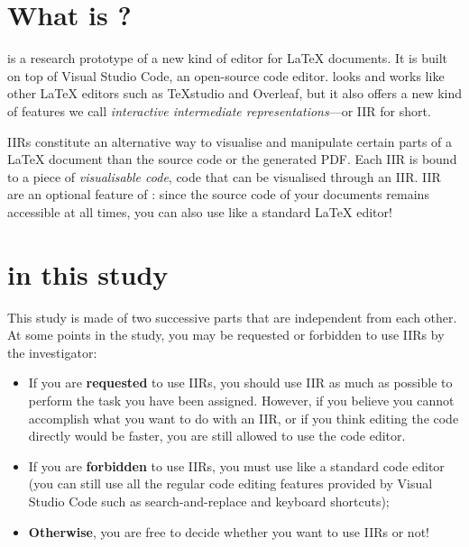 \documentclass[11pt, a4paper]{article}
\begin{document}
\vfill
\tableofcontents



\section{What is \iLaTeX{}?}
\iLaTeX{} is a research prototype of a new kind of editor for \LaTeX{} documents.
It is built on top of Visual Studio Code, an open-source code editor.
\iLaTeX{} looks and works like other \LaTeX{} editors such as TeXstudio and Overleaf, but it also offers a new kind of features we call \emph{interactive intermediate representations}---or IIR for short.

IIRs constitute an alternative way to visualise and manipulate certain parts of a \LaTeX{} document than the source code or the generated PDF.
Each IIR is bound to a piece of \emph{visualisable code}, \ie code that can be visualised through an IIR.
IIR are an optional feature of \iLaTeX{}: since the source code of your documents remains accessible at all times, you can also use \iLaTeX{} like a standard \LaTeX{} editor!



\section{\iLaTeX{} in this study}

This study is made of two successive parts that are independent from each other.
At some points in the study, you may be requested or forbidden to use IIRs by the investigator:
\begin{itemize}
    \item If you are \textbf{requested} to use IIRs, you should use IIR as much as possible to perform the task you have been assigned. However, if you believe you cannot accomplish what you want to do with an IIR, or if you think editing the code directly would be faster, you are still allowed to use the code editor.
    \item If you are \textbf{forbidden} to use IIRs, you must use \iLaTeX{} like a standard code editor (you can still use all the regular code editing features provided by Visual Studio Code such as search-and-replace and keyboard shortcuts);
    \item \textbf{Otherwise}, you are free to decide whether you want to use IIRs or not!
\end{itemize}
\end{document}
